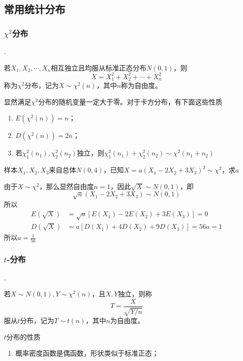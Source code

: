 \subsection{常用统计分布}
\subsubsection{\texorpdfstring{$\chi^2$}{χ}分布}
.
\begin{definition}
    若$X_1,X_2,\cdots,X_n$相互独立且均服从标准正态分布$N(0,1)$，则
    \[ X = X_1^2 + X_2^2 + \cdots + X_n^2 \]
    称为$\chi^2$分布，记为$X\sim \chi^2(n)$，其中$n$称为自由度。
\end{definition}
显然满足$\chi^2$分布的随机变量一定大于零。对于卡方分布，有下面这些性质
\begin{enumerate}[(1)]
    \item $E\left(\chi^2(n)\right) = n$；
    \item $D\left(\chi^2(n)\right) = 2n$；
    \item 若$\chi_1^2(n_1), \chi_2^2(n_2)$独立，则$\chi_1^2(n_1) + \chi_2^2(n_2) \sim \chi^2(n_1+n_2)$
\end{enumerate}

\begin{example}
    样本$X_1,X_2,X_3$来自总体$N(0,4)$，已知$X=a(X_1-2X_2+3X_3)^2\sim \chi^2$，求$a$
\end{example}
\begin{solution}
    由于$X\sim \chi^2$，那么显然自由度$n=1$，因此$\sqrt{X}\sim N(0,1)$，即
    \[ \sqrt{a}(X_1-2X_2+3X_3) \sim N(0,1) \]
    所以
    \begin{align*}
        E(\sqrt{X}) & = \sqrt{a}\left[E(X_1)-2E(X_2)+3E(X_3)\right] = 0 \\
        D(\sqrt{X}) & = a\left[D(X_1)+4D(X_2)+9D(X_3)\right] = 56a = 1
    \end{align*}
    所以$a=\frac{1}{56}$
\end{solution}

\subsubsection{\texorpdfstring{$t$}{t}-分布}
.
\begin{definition}
    若$X\sim N(0,1), Y\sim\chi^2(n)$，且$X,Y$独立，则称
    \[ T = \frac{X}{\sqrt{Y/n}} \]
    服从$t$分布，记为$T\sim t(n)$，其中$n$为自由度。
\end{definition}
$t$分布的性质
\begin{enumerate}[(1)]
    \item 概率密度函数是偶函数，形状类似于标准正态；
\end{enumerate}

